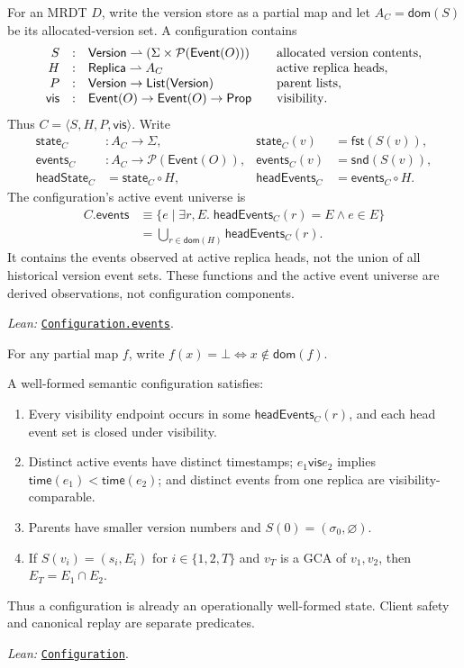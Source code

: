 \documentclass[11pt]{article}
\theoremstyle{definition}
\newcommand{\Pow}{\mathcal P}
\newcommand{\State}{\Sigma}
\newcommand{\Event}{\mathsf{Event}}
\newcommand{\Replica}{\mathsf{Replica}}
\newcommand{\Version}{\mathsf{Version}}
\newcommand{\init}{\sigma_0}
\newcommand{\vis}{\mathrel{\mathsf{vis}}}
\newcommand{\none}{\bot}
\newcommand{\src}[2]{\href{../../#1}{\texttt{#2}}}
\newcommand{\anchor}[2]{\par\smallskip\noindent\emph{Lean: }\src{#1}{#2}.}
\begin{document}
For an MRDT $D$, write the version store as a partial map and let
$A_C=\mathsf{dom}(S)$ be its allocated-version set. A configuration contains
\[
\begin{array}{rcl@{\qquad}l}
 S&:&\Version\rightharpoonup(\State\times\Pow(\Event(O)))
   &\text{allocated version contents},\\
 H&:&\Replica\rightharpoonup A_C&\text{active replica heads},\\
 P&:&\Version\to\mathsf{List}(\Version)&\text{parent lists},\\
 \vis&:&\Event(O)\to\Event(O)\to\mathsf{Prop}&\text{visibility}.
\end{array}
\]
Thus $C=\langle S,H,P,\vis\rangle$. Write
\[
\begin{aligned}
 \mathsf{state}_C&:A_C\to\State,&
 \mathsf{state}_C(v)&=\mathsf{fst}(S(v)),\\
 \mathsf{events}_C&:A_C\to\Pow(\Event(O)),&
 \mathsf{events}_C(v)&=\mathsf{snd}(S(v)),\\
 \mathsf{headState}_C&=\mathsf{state}_C\circ H,&
 \mathsf{headEvents}_C&=\mathsf{events}_C\circ H.
\end{aligned}
\]
The configuration's active event universe is
\[
\begin{aligned}
 C.\mathsf{events}&\equiv
 \{e\mid\exists r,E.\;
   \mathsf{headEvents}_C(r)=E\land e\in E\}\\
 &=\bigcup_{r\in\mathsf{dom}(H)}\mathsf{headEvents}_C(r).
\end{aligned}
\]
It contains the events observed at active replica heads, not the union of all
historical version event sets. These functions and the active event universe
are derived observations, not configuration components.
\anchor{Sal/MRDTs/Framework/Execution.lean}{Configuration.events}

For any partial map $f$, write
$f(x)=\none\Longleftrightarrow x\notin\mathsf{dom}(f)$.

A well-formed semantic configuration satisfies:
\begin{enumerate}
\item Every visibility endpoint occurs in some $\mathsf{headEvents}_C(r)$,
  and each head event set is closed under visibility.
\item Distinct active events have distinct timestamps;
  $e_1\vis e_2$ implies $\mathsf{time}(e_1)<\mathsf{time}(e_2)$; and distinct
  events from one replica are visibility-comparable.
\item Parents have smaller version numbers and $S(0)=(\init,\varnothing)$.
\item If $S(v_i)=(s_i,E_i)$ for $i\in\{1,2,T\}$ and $v_T$ is a GCA of
  $v_1,v_2$, then $E_T=E_1\cap E_2$.
\end{enumerate}
Thus a configuration is already an operationally well-formed state. Client
safety and canonical replay are separate predicates.
\anchor{Sal/MRDTs/Framework/Execution.lean}{Configuration}
\end{document}
